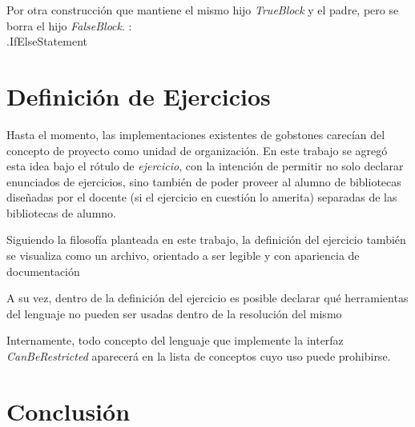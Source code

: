 Por otra construcción que mantiene el mismo hijo \textit{TrueBlock} y el padre, pero se borra el hijo \textit{FalseBlock}.
\vspace{8mm}:
\\
.IfElseStatement
\bigskip

\section{Definición de Ejercicios}\label{proyecto}

Hasta el momento, las implementaciones existentes de gobstones carecían del concepto de proyecto como unidad de organización. En este trabajo se agregó esta idea bajo el rótulo de \emph{ejercicio}, con la intención de permitir no solo declarar enunciados de ejercicios, sino también de poder proveer al alumno de bibliotecas diseñadas por el docente (si el ejercicio en cuestión lo amerita) separadas de las bibliotecas de alumno.

Siguiendo la filosofía planteada en este trabajo, la definición del ejercicio también se visualiza como un archivo, orientado a ser legible y con apariencia de documentación 


A su vez, dentro de la definición del ejercicio es posible declarar qué herramientas del lenguaje no pueden ser usadas dentro de la resolución del mismo 


Internamente, todo concepto del lenguaje que implemente la interfaz \textit{CanBeRestricted} aparecerá en la lista de conceptos cuyo uso puede prohibirse.

\section{Conclusión}\label{conclusion}

